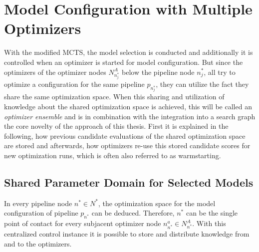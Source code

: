 \section{Model Configuration with Multiple Optimizers}
\label{sec:approach:configuration}
With the modified MCTS, the model selection is conducted and additionally it is controlled when an optimizer is started for model configuration.
But since the optimizers of the optimizer nodes $N^A_{n^*_j}$ below the pipeline node $n^*_j$, all try to optimize a configuration for the same pipeline $p_{n^*_j}$, they can utilize the fact they share the same optimization space.
When this sharing and utilization of knowledge about the shared optimization space is achieved, this will be called an \textit{optimizer ensemble} and is in combination with the integration into a search graph the core novelty of the approach of this thesis.\newline
First it is explained in the following, how previous candidate evaluations of the shared optimization space are stored and afterwards, how optimizers re-use this stored candidate scores for new optimization runs, which is often also referred to as warmstarting.

\subsection{Shared Parameter Domain for Selected Models}
\label{sec:approach:configuration:parameter}
In every pipeline node $n^* \in N^*$, the optimization space for the model configuration of pipeline $p_{n^*}$ can be deduced.
Therefore, $n^*$ can be the single point of contact for every subjacent optimizer node $n^{a}_{n^*} \in N^A_{n^*}$.
With this centralized control instance it is possible to store and distribute knowledge from and to the optimizers.

